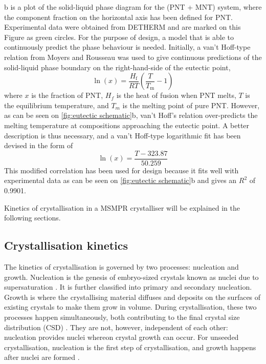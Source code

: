 b is a plot of the solid-liquid phase diagram for the (PNT + MNT) system, where the component fraction on the horizontal axis has been defined for PNT. Experimental data were obtained from DETHERM \cite{noauthor_detherm_2021} and are marked on this Figure as green circles. For the purpose of design, a model that is able to continuously predict the phase behaviour is needed. Initially, a van't Hoff-type relation from Moyers and Rousseau was used to give continuous predictions of the solid-liquid phase boundary on the right-hand-side of the eutectic point, \cite{moyers_crystallization_1987}
\begin{equation}\label{eq:vantHoff}
    \ln(x) = \frac{H_{\mathrm{f}}}{R T}\left(\frac{T}{T_{\mathrm{m}}} - 1\right)
\end{equation}
where $x$ is the fraction of PNT, $H_f$ is the heat of fusion when PNT melts, $T$ is the equilibrium temperature, and $T_{m}$ is the melting point of pure PNT. However, as can be seen on \cref{fig:eutectic schematic}b, van't Hoff's relation over-predicts the melting temperature at compositions approaching the eutectic point. A better description is thus necessary, and a van't Hoff-type logarithmic fit has been devised in the form of 
\begin{equation} \label{eq:fittedvantHoffcorrelation}
    \ln(x) = \frac{T - 323.87}{50.259}
\end{equation}
This modified correlation has been used for design because it fits well with experimental data as can be seen on \cref{fig:eutectic schematic}b and gives an $R^2$ of 0.9901.

Kinetics of crystallisation in a MSMPR crystalliser will be explained in the following sections.

\subsection{Crystallisation kinetics} \label{sec: Crystallisation kinetics}
The kinetics of crystallisation is governed by two processes: nucleation and growth. Nucleation is the genesis of embryo-sized crystals known as nuclei due to supersaturation \cite{richardson_chemical_2006}. It is further classified into primary and secondary nucleation. Growth is where the crystallising material diffuses and deposits on the surfaces of existing crystals to make them grow in volume. During crystallisation, these two processes happen simultaneously, both contributing to the final crystal size distribution (CSD) \cite{richardson_chemical_2006}. They are not, however, independent of each other: nucleation provides nuclei whereon crystal growth can occur. For unseeded crystallisation, nucleation is the first step of crystallisation, and growth happens after nuclei are formed \cite{mullin_crystallization_2001}.

